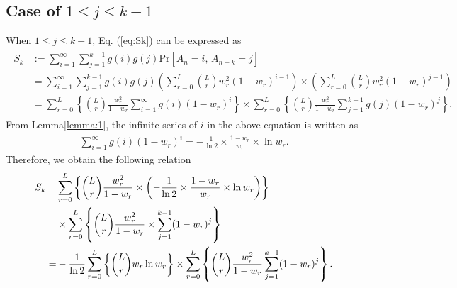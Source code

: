 \subsection{Case of $1 \leq j \leq k-1$}
When $1 \leq j \leq k-1$, Eq. (\ref{eq:Sk}) can be expressed as
\begin{align}\begin{split}
  S_{k} 
  &:= \sum_{i=1}^{\infty} \sum_{j=1}^{k-1} g(i) g(j) \mathrm{Pr} \left[ A_n=i,\,A_{n+k}=j \right] \\
  &= \sum_{i=1}^{\infty} \sum_{j=1}^{k-1} g(i) g(j) \left( \sum_{r=0}^{L} \binom{L}{r}w_r^2 (1-w_r)^{i-1} \right) \times \left( \sum_{r=0}^{L} \binom{L}{r}w_r^2 (1-w_r)^{j-1} \right) \\
  &= \sum_{r=0}^{L} \left\{\binom{L}{r} \frac{w_r^2}{1-w_r} \sum_{i=1}^{\infty} g(i)(1-w_r)^{i} \right\}
  \times \sum_{r=0}^{L} \left\{ \binom{L}{r} \frac{w_r^2}{1-w_r} \sum_{j=1}^{k-1} g(j)(1-w_r)^{j} \right\}.
\end{split}\end{align}
From Lemma\ref{lemma:1}, the infinite series of $i$ in the above equation is written as
\begin{align}
	\sum_{i=1}^{\infty} g(i) (1 - w_r)^{i} = - \frac{1}{\ln 2} \times \frac{1-w_r}{w_r}\times\ln w_r.
\end{align}
%
Therefore, we obtain the following relation
\begin{align}\begin{split}
  S_{k}
  =& \sum_{r=0}^{L} \left\{ \dbinom{L}{r} \frac{w_r^2}{1-w_r}  \times \left(- \frac{1}{\ln 2} \times \frac{1-w_r}{w_r}\times\ln w_r \right) \right\} \\
  &\times \sum_{r=0}^{L} \left\{ \dbinom{L}{r} \frac{w_r^2}{1-w_r} \times \sum_{j=1}^{k-1} (1-w_r)^{j} \right\} \\
  =&-\frac{1}{\ln 2}\sum_{r=0}^{L} \left\{ \dbinom{L}{r} w_r \ln w_r \right\} \times \sum_{r=0}^{L} \left\{ \dbinom{L}{r} \frac{w_r^2}{1-w_r} \sum_{j=1}^{k-1} (1-w_r)^{j} \right\}.
\end{split}\end{align}
